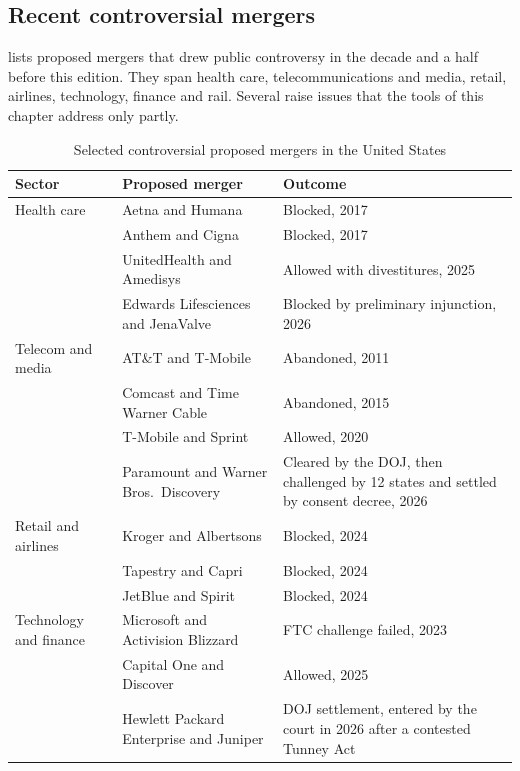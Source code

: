 \subsection{Recent controversial mergers}\label{sec:11-recent}

 lists proposed mergers that drew public controversy in the decade and a half before this edition.
They span health care, telecommunications and media, retail, airlines, technology, finance and rail. Several raise
issues that the tools of this chapter address only partly.

\begin{table}[htbp]
\centering
\caption{Selected controversial proposed mergers in the United States}
\label{tab:11-recent}
\begin{threeparttable}
\small
\begin{tabularx}{\textwidth}{@{}>{\raggedright\arraybackslash}p{2.9cm}>{\raggedright\arraybackslash}p{5.4cm}%
>{\raggedright\arraybackslash}X@{}}
\toprule
Sector & Proposed merger & Outcome \\
\midrule
Health care & Aetna and Humana & Blocked, 2017 \\
 & Anthem and Cigna & Blocked, 2017 \\
 & UnitedHealth and Amedisys & Allowed with divestitures, 2025 \\
 & Edwards Lifesciences and JenaValve & Blocked by preliminary injunction, 2026 \\
\addlinespace
Telecom and media & AT\&T and T-Mobile & Abandoned, 2011 \\
 & Comcast and Time Warner Cable & Abandoned, 2015 \\
 & T-Mobile and Sprint & Allowed, 2020 \\
 & Paramount and Warner Bros.\ Discovery & Cleared by the DOJ, then challenged by 12 states and settled by consent
decree, 2026 \\
\addlinespace
Retail and airlines & Kroger and Albertsons & Blocked, 2024 \\
 & Tapestry and Capri & Blocked, 2024 \\
 & JetBlue and Spirit & Blocked, 2024 \\
\addlinespace
Technology and finance & Microsoft and Activision Blizzard & FTC challenge failed, 2023 \\
 & Capital One and Discover & Allowed, 2025 \\
 & Hewlett Packard Enterprise and Juniper & DOJ settlement, entered by the court in 2026 after a contested Tunney Act

\end{tabularx}
\end{threeparttable}
\end{table}
